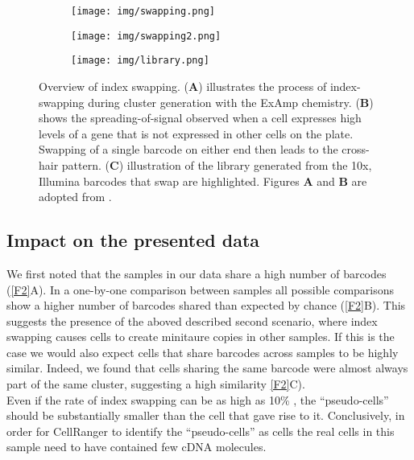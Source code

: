 \documentclass{article}
\begin{document}
\begin{figure}
    \begin{subfigure}[c]{0.5\textwidth}
	\texttt{[image: img/swapping.png]}
    \caption{}
    \end{subfigure}
    \begin{subfigure}[c]{0.5\textwidth}
	\texttt{[image: img/swapping2.png]}
    \caption{}
    \end{subfigure}
    \begin{subfigure}[c]{0.5\textwidth}
	\texttt{[image: img/library.png]}
    \caption{}
    \end{subfigure}
    \caption{Overview of index swapping.
	(\textbf{A}) illustrates the process of index-swapping during cluster generation with the ExAmp chemistry.
	(\textbf{B}) shows the spreading-of-signal observed when a cell expresses high levels of a gene that is not expressed in other cells on the plate.
	Swapping of a single barcode on either end then leads to the cross-hair pattern.
	(\textbf{C}) illustration of the library generated from the 10x, Illumina barcodes that swap are highlighted. 
	Figures \textbf{A} and \textbf{B} are adopted from \autocite{Sinha2017}.
    }
    \label{F1}
\end{figure}

\subsection*{Impact on the presented data}
We first noted that the samples in our data share a high number of barcodes (\autoref{F2}A).
In a one-by-one comparison between samples all possible comparisons show a higher number of barcodes shared than expected by chance (\autoref{F2}B).
This suggests the presence of the aboved described second scenario, where index swapping causes cells to create minitaure copies in other samples.
If this is the case we would also expect cells that share barcodes across samples to be highly similar.
Indeed, we found that cells sharing the same barcode were almost always part of the same cluster, suggesting a high similarity \autoref{F2}C). \\
Even if the rate of index swapping can be as high as 10\% \autocite{Sinha2017}, the ``pseudo-cells'' should be substantially smaller than the cell that gave rise to it. 
Conclusively, in order for CellRanger to identify the ``pseudo-cells'' as cells the real cells in this sample need to have contained few cDNA molecules.
\end{document}
